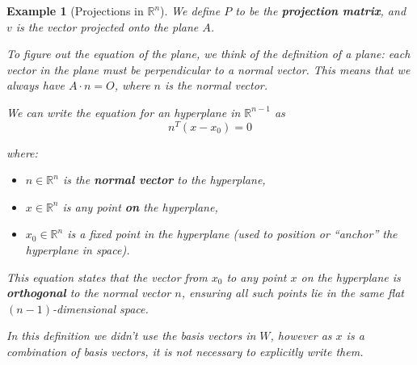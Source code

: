 \documentclass{book}
\newtheorem{example}{Example}[chapter]
\begin{document}
\begin{example}[Projections in $\mathbb{R}^{n}$]
    We define $P$ to be the \textbf{projection matrix}, and $v$ is the vector
    projected onto the plane $A$.

    To figure out the equation of the plane, we think of the definition of a plane:
    each vector in the plane must be perpendicular to a normal vector. This means
    that we always have $A\cdot n = O$, where $n$ is the normal vector.

    We can write the equation for an hyperplane in $\mathbb{R}^{n-1}$ as
    \begin{equation}
        n^{T}(x-x_0) = 0
    \end{equation}

    where:
    \begin{itemize}
        \item $n \in \mathbb{R}^n$ is the \textbf{normal vector} to the hyperplane,
        \item $x \in \mathbb{R}^n$ is any point \textbf{on} the hyperplane,
        \item $x_0 \in \mathbb{R}^n$ is a fixed point in the hyperplane (used to position or ``anchor'' the hyperplane in space).
    \end{itemize}

    This equation states that the vector from $x_0$ to any point $x$ on the
    hyperplane is \textbf{orthogonal} to the normal vector $n$, ensuring all such
    points lie in the same flat $(n-1)$-dimensional space.

    In this definition we didn't use the basis vectors in $W$, however as $x$ is a
    combination of basis vectors, it is not necessary to explicitly write them.
\end{example}
\end{document}
